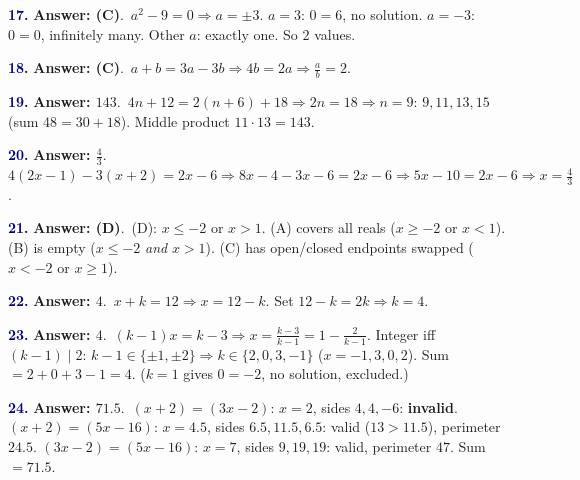 \documentclass[10pt]{article}
\begin{document}
\begin{minipage}{\linewidth}\textbf{\textcolor{NAVY}{17.}} \textbf{Answer: (C)}.\ $a^2-9=0\Rightarrow a=\pm3$. $a=3$: $0=6$, no solution. $a=-3$: $0=0$, infinitely many. Other $a$: exactly one. So $2$ values.\end{minipage}\par\vspace{5pt}
\begin{minipage}{\linewidth}\textbf{\textcolor{NAVY}{18.}} \textbf{Answer: (C)}.\ $a+b=3a-3b\Rightarrow4b=2a\Rightarrow\frac ab=2$.\end{minipage}\par\vspace{5pt}
\begin{minipage}{\linewidth}\textbf{\textcolor{NAVY}{19.}} \textbf{Answer: $143$}.\ $4n+12=2(n+6)+18\Rightarrow2n=18\Rightarrow n=9$: $9,11,13,15$ (sum $48=30+18$). Middle product $11\cdot13=143$.\end{minipage}\par\vspace{5pt}
\begin{minipage}{\linewidth}\textbf{\textcolor{NAVY}{20.}} \textbf{Answer: $\tfrac{4}{3}$}.\ $4(2x-1)-3(x+2)=2x-6\Rightarrow8x-4-3x-6=2x-6\Rightarrow5x-10=2x-6\Rightarrow x=\frac43$.\end{minipage}\par\vspace{5pt}
\begin{minipage}{\linewidth}\textbf{\textcolor{NAVY}{21.}} \textbf{Answer: (D)}.\ (D): $x\le-2$ or $x>1$. (A) covers all reals ($x\ge-2$ or $x<1$). (B) is empty ($x\le-2$ \emph{and} $x>1$). (C) has open/closed endpoints swapped ($x<-2$ or $x\ge1$).\end{minipage}\par\vspace{5pt}
\begin{minipage}{\linewidth}\textbf{\textcolor{NAVY}{22.}} \textbf{Answer: $4$}.\ $x+k=12\Rightarrow x=12-k$. Set $12-k=2k\Rightarrow k=4$.\end{minipage}\par\vspace{5pt}
\begin{minipage}{\linewidth}\textbf{\textcolor{NAVY}{23.}} \textbf{Answer: $4$}.\ $(k-1)x=k-3\Rightarrow x=\frac{k-3}{k-1}=1-\frac2{k-1}$. Integer iff $(k-1)\mid2$: $k-1\in\{\pm1,\pm2\}\Rightarrow k\in\{2,0,3,-1\}$ ($x=-1,3,0,2$). Sum $=2+0+3-1=4$. ($k=1$ gives $0=-2$, no solution, excluded.)\end{minipage}\par\vspace{5pt}
\begin{minipage}{\linewidth}\textbf{\textcolor{NAVY}{24.}} \textbf{Answer: $71.5$}.\ $(x+2)=(3x-2)$: $x=2$, sides $4,4,-6$: \textbf{invalid}. $(x+2)=(5x-16)$: $x=4.5$, sides $6.5,11.5,6.5$: valid ($13>11.5$), perimeter $24.5$. $(3x-2)=(5x-16)$: $x=7$, sides $9,19,19$: valid, perimeter $47$. Sum $=71.5$.\end{minipage}\par\vspace{5pt}
\end{document}
